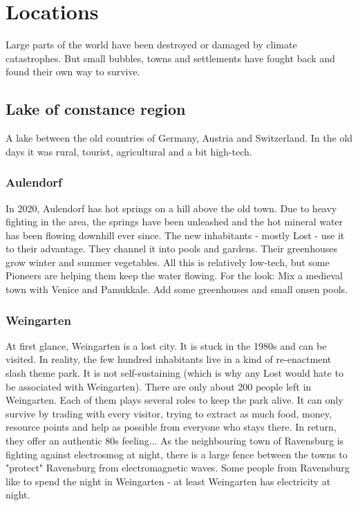 \chapter{Locations}

Large parts of the world have been destroyed or damaged by climate catastrophes. But small bubbles, towns and settlements have fought back and found their own way to survive.

\section{Lake of constance region}

A lake between the old countries of Germany, Austria and Switzerland.
In the old days it was rural, tourist, agricultural and a bit high-tech.

\subsection{Aulendorf}
\label{subsec:Aulendorf}

In 2020, Aulendorf has hot springs on a hill above the old town. Due to heavy fighting in the area, the springs have been unleashed and the hot mineral water has been flowing downhill ever since. The new inhabitants - mostly Lost - use it to their advantage.
They channel it into pools and gardens. Their greenhouses grow winter and summer vegetables.
All this is relatively low-tech, but some Pioneers are helping them keep the water flowing. For the look: Mix a medieval town with Venice and Pamukkale. Add some greenhouses and small onsen pools.


\subsection{Weingarten}
\label{subsec:Weingarten}

At first glance, Weingarten is a lost city. It is stuck in the 1980s and can be visited. In reality, the few hundred inhabitants live in a kind of re-enactment slash theme park. It is not self-sustaining (which is why any Lost would hate to be associated with Weingarten).
There are only about 200 people left in Weingarten. Each of them plays several roles to keep the park alive.
It can only survive by trading with every visitor, trying to extract as much food, money, resource points and help as possible from everyone who stays there. In return, they offer an authentic 80s feeling...
As the neighbouring town of Ravensburg is fighting against electrosmog at night, there is a large fence between the towns to "protect" Ravensburg from electromagnetic waves.
Some people from Ravensburg like to spend the night in Weingarten - at least Weingarten has electricity at night.

